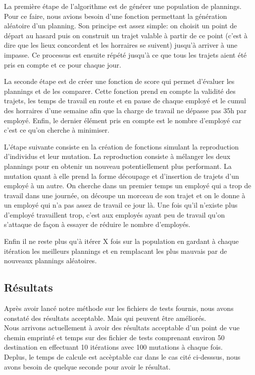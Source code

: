 \documentclass{report}
\begin{document}
La première étape de l'algorithme est de générer une population de plannings. Pour ce faire, nous avions besoin d'une
fonction permettant la génération aléatoire d'un planning. Son principe est assez simple: on choisit un point de départ
au hasard puis on construit un trajet valable à partir de ce point (c'est à dire que les lieux concordent et les
horraires se suivent) jusqu'à arriver à une impasse. Ce processus est ensuite répété jusqu'à ce que tous les trajets
aient été pris en compte et ce pour chaque jour.

La seconde étape est de créer une fonction de score qui permet d'évaluer les plannings et de les comparer. Cette
fonction prend en compte la validité des trajets, les temps de travail en route et en pause de chaque employé et le cumul des horraires
d'une semaine afin que la charge de travail ne dépasse pas 35h par employé. Enfin, le dernier élément pris en compte est
le nombre d'employé car c'est ce qu'on cherche à minimiser.

L'étape suivante consiste en la création de fonctions simulant la reproduction d'individus et leur mutation. La
reproduction consiste à mélanger les deux plannings pour en obtenir un nouveau potentiellement plus performant. La
mutation quant à elle prend la forme découpage et d'insertion de trajets d'un employé à un autre. On cherche dans un
premier temps un employé qui a trop de travail dans une journée, on découpe un morceau de son trajet et on le donne à un
employé qui n'a pas assez de travail ce jour là. Une fois qu'il n'existe plus d'employé travaillent trop, c'est aux
employés ayant peu de travail qu'on s'attaque de façon à essayer de réduire le nombre d'employés.

Enfin il ne reste plus qu'à itérer X fois sur la population en gardant à chaque itération les meilleurs plannings et en
remplacant les plus mauvais par de nouveaux plannings aléatoires.

\subsection{Résultats}
Après avoir lancé notre méthode sur les fichiers de tests fournis, nous avons constaté des résultats acceptable. Mais qui peuvent être améliorés.\\

Nous arrivons actuellement à avoir des résultats acceptable d'un point de vue chemin emprinté et temps sur des fichier de tests comprenant
environ 50 destination en effectuant 10 itérations avec 100 mutations à chaque fois.\\
Deplus, le temps de calcule est accèptable car dans le cas cité ci-desssus, nous avons besoin de quelque seconde pour avoir le résultat.
\end{document}
